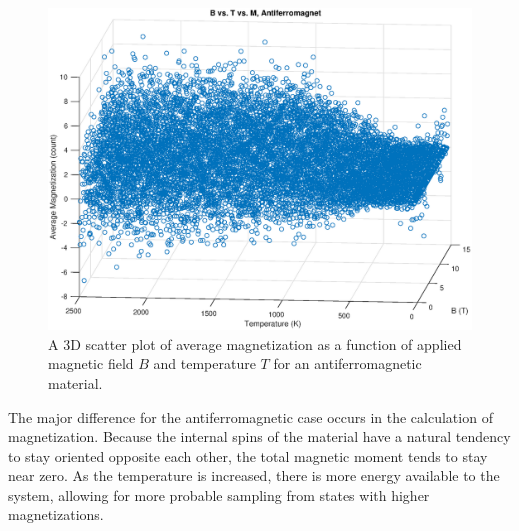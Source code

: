 \documentclass[12pt]{article}
\begin{document}
\begin{figure}[!h]
\includegraphics[width=\linewidth]{./Antiferrographs/antiferroMsurf.eps}
\caption{A 3D scatter plot of average magnetization as a function of applied magnetic field $B$ and temperature $T$ for an antiferromagnetic material.}
\label{antiferroMsurf}
\end{figure}
The major difference for the antiferromagnetic case occurs in the calculation of magnetization.  Because the internal spins of the material have a natural tendency to stay oriented opposite each other, the total magnetic moment tends to stay near zero.  As the temperature is increased, there is more energy available to the system, allowing for more probable sampling from states with higher magnetizations.
\end{document}
